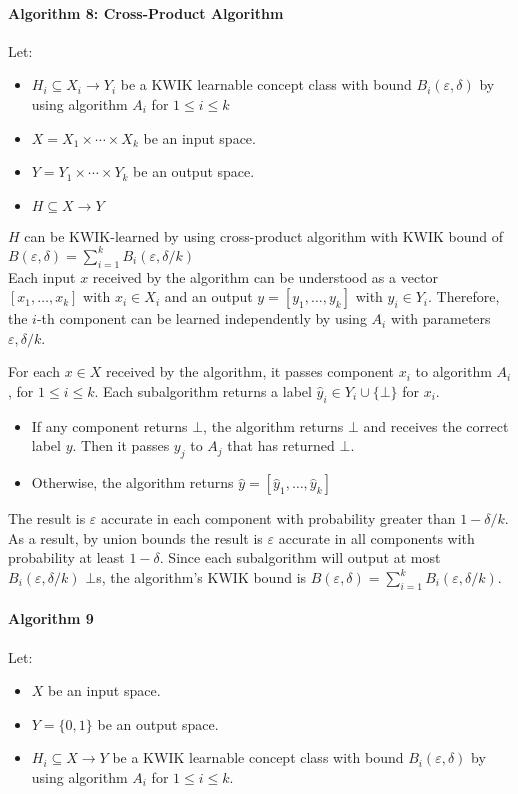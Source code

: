 \paragraph{Algorithm 8: Cross-Product Algorithm}
Let:
\begin{itemize}
  \item $H_i \subseteq X_i \to Y_i$ be a KWIK learnable concept class with bound $B_i(\varepsilon, \delta)$ by using algorithm $A_i$ for $1 \leq i \leq k$
  \item $X = X_1 \times \cdots \times X_k$ be an input space.
  \item $Y = Y_1 \times \cdots \times Y_k$ be an output space.
  \item $H \subseteq X \to Y$
\end{itemize}

$H$ can be KWIK-learned by using cross-product algorithm with KWIK bound of $B(\varepsilon,\delta) =  \sum^{k}_{i=1}B_i(\varepsilon,\delta/k)$ \\

Each input $x$ received by the algorithm can be understood as a vector $[x_1,\ldots,x_k]$ with $x_i \in X_i$ and an output $y = [y_1, \ldots, y_k]$ with $y_i \in Y_i$. Therefore, the $i$-th component can be learned independently by using $A_i$
with parameters $\varepsilon, \delta/k$.

For each $x \in X$ received by the algorithm, it passes component $x_i$ to algorithm $A_i$, for $1 \leq i \leq k$. Each subalgorithm returns a label $\hat{y}_i \in Y_i \cup \{\bot\}$ for $x_i$.
\begin{itemize}
  \item  If any component returns $\bot$, the algorithm returns $\bot$ and receives the correct label $y$.
    Then it passes $y_j$ to $A_j$ that has returned $\bot$.
  \item Otherwise, the algorithm returns $\hat{y} = [\hat{y}_1, \ldots, \hat{y}_k]$
\end{itemize}

The result is $\varepsilon$ accurate in each component with probability greater than $1-\delta/k$. As a result, by union bounds the result is $\varepsilon$ accurate in all components with probability at least $1-\delta$.
Since each subalgorithm will output at most $B_i(\varepsilon,\delta/k)$ $\bot$s, the algorithm's KWIK bound is $B(\varepsilon, \delta) = \sum^{k}_{i=1} B_i(\varepsilon,\delta/k)$.


\paragraph{Algorithm 9}
Let:
\begin{itemize}
  \item $X$ be an input space.
  \item $Y = \{0, 1\}$ be an output space.
  \item $H_i \subseteq X \to Y$ be a KWIK learnable concept class with bound $B_i(\varepsilon, \delta)$ by using algorithm $A_i$ for $1 \leq i \leq k$.
\end{itemize}
